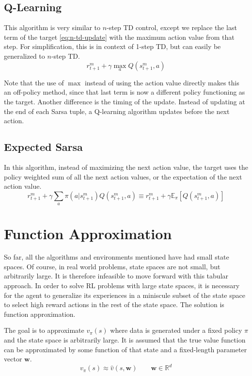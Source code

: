 \documentclass{article}
\begin{document}
\subsection{Q-Learning}
This algorithm is very similar to $n$-step TD control, except we replace the last term of the target \eqref{eq:n-td-update} with the maximum action value 
from that step. For simplification, this is in context of 1-step TD, but can easily be generalized to $n$-step TD.
\begin{equation}
  r_{t+1}^m + \gamma \max_a Q(s_{t+1}^m, a)
\end{equation}

Note that the use of $\max$ instead of using the action value directly makes this an off-policy method, since that last term is 
now a different policy functioning as the target. Another difference is the timing of the update. Instead of updating at the end of
each Sarsa tuple, a Q-learning algorithm updates before the next action.

\subsection{Expected Sarsa}
In this algorithm, instead of maximizing the next action value, the target uses the policy weighted sum of all the next action values, or 
the expectation of the next action value.
\begin{equation}
  r_{t+1}^m + \gamma \sum_a \pi(a|s_{t+1}^m) Q(s_{t+1}^m, a) \equiv r_{t+1}^m + \gamma \mathbb{E}_\pi[Q(s_{t+1}^m, a)]
\end{equation}



\section{Function Approximation}
So far, all the algorithms and environments mentioned have had small state spaces. Of course, in real world problems, state spaces are not small,
but arbitrarily large. It is therefore infeasible to move forward with this tabular approach. In order to solve RL problems with large state spaces,
it is necessary for the agent to generalize its experiences in a miniscule subset of the state space to select high reward actions in the rest of 
the state space. The solution is function approximation.

The goal is to approximate $v_\pi(s)$ where data is generated under a fixed policy $\pi$ and the state space is arbitrarily large. It is assumed 
that the true value function can be approximated by some function of that state and a fixed-length parameter vector $\bm{w}$.
\begin{equation}
  v_\pi(s) \approx \hat{v}(s, \bm{w}) \qquad \bm{w} \in \mathbb{R}^d
\end{equation}
\end{document}
